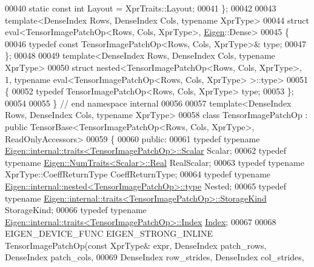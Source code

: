 \begin{DoxyCode}
00040   \textcolor{keyword}{static} \textcolor{keyword}{const} \textcolor{keywordtype}{int} Layout = XprTraits::Layout;
00041 \};
00042 
00043 \textcolor{keyword}{template}<DenseIndex Rows, DenseIndex Cols, \textcolor{keyword}{typename} XprType>
00044 \textcolor{keyword}{struct }eval<TensorImagePatchOp<Rows, Cols, XprType>, \hyperlink{namespace_eigen}{Eigen}::Dense>
00045 \{
00046   \textcolor{keyword}{typedef} \textcolor{keyword}{const} TensorImagePatchOp<Rows, Cols, XprType>& type;
00047 \};
00048 
00049 \textcolor{keyword}{template}<DenseIndex Rows, DenseIndex Cols, \textcolor{keyword}{typename} XprType>
00050 \textcolor{keyword}{struct }nested<TensorImagePatchOp<Rows, Cols, XprType>, 1, typename eval<TensorImagePatchOp<Rows, Cols, 
      XprType> >::type>
00051 \{
00052   \textcolor{keyword}{typedef} TensorImagePatchOp<Rows, Cols, XprType> type;
00053 \};
00054 
00055 \}  \textcolor{comment}{// end namespace internal}
00056 
00057 \textcolor{keyword}{template}<DenseIndex Rows, DenseIndex Cols, \textcolor{keyword}{typename} XprType>
00058 \textcolor{keyword}{class }TensorImagePatchOp : \textcolor{keyword}{public} TensorBase<TensorImagePatchOp<Rows, Cols, XprType>, ReadOnlyAccessors>
00059 \{
00060   \textcolor{keyword}{public}:
00061   \textcolor{keyword}{typedef} \textcolor{keyword}{typename} \hyperlink{struct_eigen_1_1internal_1_1traits}{Eigen::internal::traits<TensorImagePatchOp>::Scalar}
       Scalar;
00062   \textcolor{keyword}{typedef} \textcolor{keyword}{typename} \hyperlink{group___sparse_core___module}{Eigen::NumTraits<Scalar>::Real} RealScalar;
00063   \textcolor{keyword}{typedef} \textcolor{keyword}{typename} XprType::CoeffReturnType CoeffReturnType;
00064   \textcolor{keyword}{typedef} \textcolor{keyword}{typename} \hyperlink{class_eigen_1_1internal_1_1_tensor_lazy_evaluator_writable}{Eigen::internal::nested<TensorImagePatchOp>::type}
       Nested;
00065   \textcolor{keyword}{typedef} \textcolor{keyword}{typename} \hyperlink{struct_eigen_1_1internal_1_1traits}{Eigen::internal::traits<TensorImagePatchOp>::StorageKind}
       StorageKind;
00066   \textcolor{keyword}{typedef} \textcolor{keyword}{typename} \hyperlink{struct_eigen_1_1internal_1_1traits}{Eigen::internal::traits<TensorImagePatchOp>::Index}
       \hyperlink{namespace_eigen_a62e77e0933482dafde8fe197d9a2cfde}{Index};
00067 
00068   EIGEN\_DEVICE\_FUNC EIGEN\_STRONG\_INLINE TensorImagePatchOp(\textcolor{keyword}{const} XprType& expr, DenseIndex patch\_rows, 
      DenseIndex patch\_cols,
00069                                                            DenseIndex row\_strides, DenseIndex col\_strides,

\end{DoxyCode}
